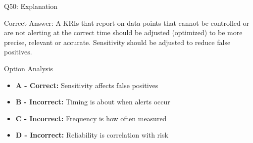 \documentclass{beamer}
\begin{document}
	\begin{frame}{Q50: Explanation}
		\begin{block}{Correct Answer: A}
			KRIs that report on data points that cannot be controlled or are not alerting at the correct time should be adjusted (optimized) to be more precise, relevant or accurate. Sensitivity should be adjusted to reduce false positives.
		\end{block}
		\begin{block}{Option Analysis}
			\begin{itemize}
				\item \textbf{A - Correct:} Sensitivity affects false positives
				\item \textbf{B - Incorrect:} Timing is about when alerts occur
				\item \textbf{C - Incorrect:} Frequency is how often measured
				\item \textbf{D - Incorrect:} Reliability is correlation with risk
			\end{itemize}
		\end{block}
	\end{frame}
	
	
	
\end{document}
